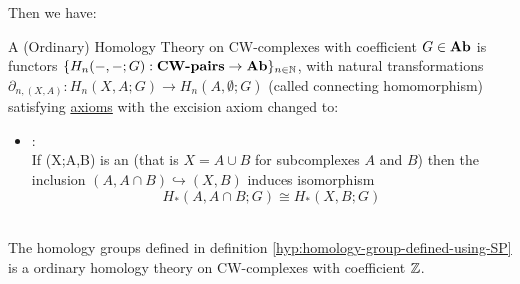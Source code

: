     Then we have:
    \begin{defn}
        A (Ordinary) Homology Theory on  CW-complexes with coefficient $G \in \mathbf{Ab}$ is
        functors $\{H_n(-,-;G) : \textbf{CW-pairs} \to \mathbf{Ab}\}_{n \in \mathbb N}$,
        with natural transformations ${\partial_{n,(X,A)} : H_n(X,A;G) \to H_n(A,\emptyset;G)}$
        (called connecting homomorphism)\\
        satisfying \hyperref[hyp:Ordinary-Homology-Theory]{axioms}
        with the excision axiom changed to:
        \begin{itemize}
            \item {}:\\ 
                If (X;A,B) is an  (that is $X = A \cup B$ for subcomplexes $A$ and $B$)
                then the inclusion $(A,A \cap B) \hookrightarrow (X,B)$
                induces isomorphism
                $$
                H_*(A,A\cap B ; G) \cong H_*(X,B;G)
                $$\\
        \end{itemize}
    \end{defn}

    \begin{prop}
        The homology groups defined in definition \ref{hyp:homology-group-defined-using-SP}
        is a ordinary homology theory on CW-complexes with coefficient $\mathbb Z$.
    \end{prop}

